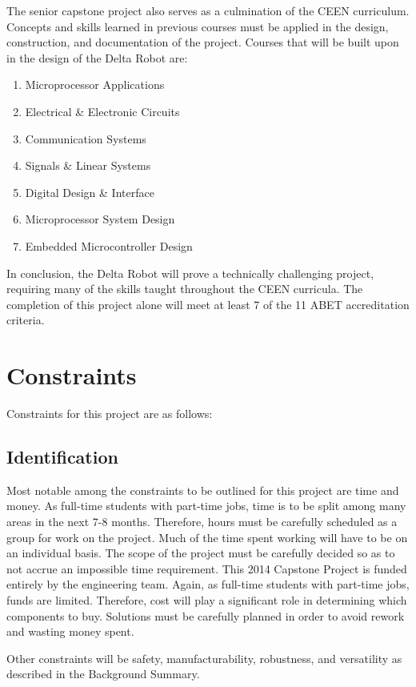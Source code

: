 \documentclass[11pt]{report}
\begin{document}
The senior capstone project also serves as a culmination of the CEEN curriculum. Concepts and skills learned in previous courses must be applied in the design, construction, and documentation of the project.
Courses that will be built upon in the design of the Delta Robot are:
\begin{enumerate} \parskip2pt
	\item Microprocessor Applications
	\item Electrical \& Electronic Circuits
	\item Communication Systems
	\item Signals \& Linear Systems
	\item Digital Design \& Interface
	\item Microprocessor System Design
	\item Embedded Microcontroller Design
\end{enumerate}

In conclusion, the Delta Robot will prove a technically challenging project, requiring many of the skills taught throughout the CEEN curricula.
The completion of this project alone will meet at least 7 of the 11 ABET accreditation criteria.

\section{Constraints}	
Constraints for this project are as follows:

\subsection{ Identification}
Most notable among the constraints to be outlined for this project are time and money.
As full-time students with part-time jobs, time is to be split among many areas in the next 7-8 months.
Therefore, hours must be carefully scheduled as a group for work on the project.
Much of the time spent working will have to be on an individual basis.
The scope of the project must be carefully decided so as to not accrue an impossible time requirement. 
This 2014 Capstone Project is funded entirely by the engineering team. 
Again, as full-time students with part-time jobs, funds are limited.
Therefore, cost will play a significant role in determining which components to buy.
Solutions must be carefully planned in order to avoid rework and wasting money spent.

Other constraints will be safety, manufacturability, robustness, and versatility as described in the Background Summary.
\end{document}
